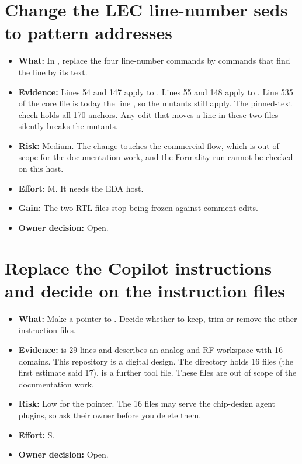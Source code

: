 \section{Change the LEC line-number seds to pattern addresses}\label{um:guide:cleanup-recommendations:lec-seds}

\begin{itemize}
\item \textbf{What:} In , replace the four line-number  commands by commands that find the line by its text.
\item \textbf{Evidence:} Lines 54 and 147 apply  to . Lines 55 and 148 apply  to . Line 535 of the core file is today the line , so the mutants still apply. The pinned-text check holds all 170 anchors. Any edit that moves a line in these two files silently breaks the mutants.
\item \textbf{Risk:} Medium. The change touches the commercial flow, which is out of scope for the documentation work, and the Formality run cannot be checked on this host.
\item \textbf{Effort:} M. It needs the EDA host.
\item \textbf{Gain:} The two RTL files stop being frozen against comment edits.
\item \textbf{Owner decision:} Open.
\end{itemize}

\section{Replace the Copilot instructions and decide on the instruction files}\label{um:guide:cleanup-recommendations:copilot-instructions}

\begin{itemize}
\item \textbf{What:} Make  a pointer to . Decide whether to keep, trim or remove the other instruction files.
\item \textbf{Evidence:}  is 29 lines and describes an analog and RF workspace with 16 domains. This repository is a digital design. The directory  holds 16 files (the first estimate said 17).  is a further tool file. These files are out of scope of the documentation work.
\item \textbf{Risk:} Low for the pointer. The 16 files may serve the chip-design agent plugins, so ask their owner before you delete them.
\item \textbf{Effort:} S.
\item \textbf{Owner decision:} Open.
\end{itemize}

